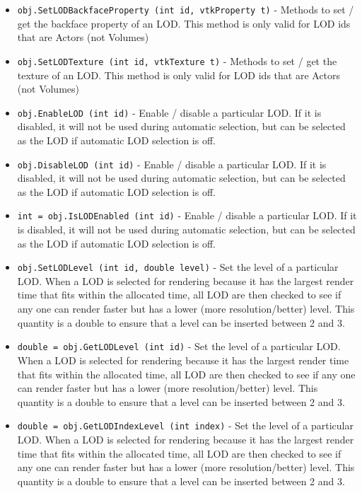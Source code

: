 \begin{itemize}
\item  \verb|obj.SetLODBackfaceProperty (int id, vtkProperty t)| -  Methods to set / get the backface property of an LOD. This method is only
 valid for LOD ids that are Actors (not Volumes)

\item  \verb|obj.SetLODTexture (int id, vtkTexture t)| -  Methods to set / get the texture of an LOD. This method is only
 valid for LOD ids that are Actors (not Volumes)

\item  \verb|obj.EnableLOD (int id)| -  Enable / disable a particular LOD. If it is disabled, it will not
 be used during automatic selection, but can be selected as the
 LOD if automatic LOD selection is off.

\item  \verb|obj.DisableLOD (int id)| -  Enable / disable a particular LOD. If it is disabled, it will not
 be used during automatic selection, but can be selected as the
 LOD if automatic LOD selection is off.

\item  \verb|int = obj.IsLODEnabled (int id)| -  Enable / disable a particular LOD. If it is disabled, it will not
 be used during automatic selection, but can be selected as the
 LOD if automatic LOD selection is off.

\item  \verb|obj.SetLODLevel (int id, double level)| -  Set the level of a particular LOD. When a LOD is selected for
 rendering because it has the largest render time that fits within
 the allocated time, all LOD are then checked to see if any one can
 render faster but has a lower (more resolution/better) level.
 This quantity is a double to ensure that a level can be inserted 
 between 2 and 3.

\item  \verb|double = obj.GetLODLevel (int id)| -  Set the level of a particular LOD. When a LOD is selected for
 rendering because it has the largest render time that fits within
 the allocated time, all LOD are then checked to see if any one can
 render faster but has a lower (more resolution/better) level.
 This quantity is a double to ensure that a level can be inserted 
 between 2 and 3.

\item  \verb|double = obj.GetLODIndexLevel (int index)| -  Set the level of a particular LOD. When a LOD is selected for
 rendering because it has the largest render time that fits within
 the allocated time, all LOD are then checked to see if any one can
 render faster but has a lower (more resolution/better) level.
 This quantity is a double to ensure that a level can be inserted 
 between 2 and 3.


\end{itemize}

